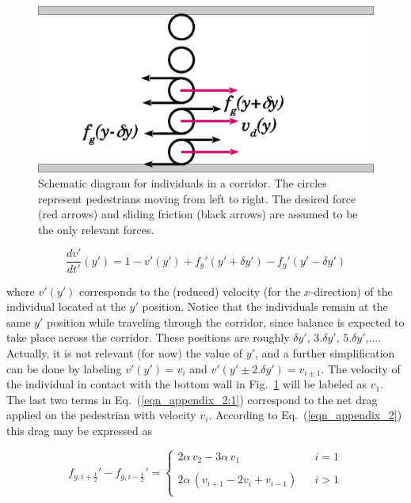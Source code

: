 \begin{figure}[htbp!]
\includegraphics[width=\columnwidth]
{./plots/pasillo.eps}
\caption{\label{pasillo} Schematic diagram for individuals in a corridor. 
The circles represent pedestrians moving from left to right. The desired force 
(red arrows) and sliding friction (black arrows) are assumed to be the only 
relevant forces.}
\end{figure}

 
\begin{equation}
\displaystyle\frac{dv'}{dt'}(y')=1-v'(y')+f_g'(y'+\delta 
y')-f_g'(y'-\delta y')\label{eqn_appendix_2:1}
 \end{equation}

where $v'(y')$ corresponds to the (reduced) velocity (for the $x$-direction) of 
the individual located at the $y'$ position. Notice that the individuals 
remain at the same $y'$ position while traveling through the corridor, since 
balance is expected to take place across the corridor. These positions are 
roughly $\delta y'$, $3.\delta y'$, $5.\delta y'$,.... Actually, it is not 
relevant (for now) the value of $y'$, and a further simplification can be done 
by labeling $v'(y')=v_i$ and $v'(y'\pm 2.\delta y')=v_{i\pm 1}$. The velocity 
of the individual in contact with the bottom wall in Fig.~\ref{pasillo} will be 
labeled as $v_1$. \\

The last two terms in Eq.~(\ref{eqn_appendix_2:1}) correspond to the 
net drag applied on the pedestrian with velocity $v_i$. According to 
Eq.~(\ref{eqn_appendix_2}) this drag may be expressed as

\begin{equation}
 f_{g,i+\frac{1}{2}}'-f_{g,i-\frac{1}{2}}'=
  \left\{\begin{array}{lcl}
          2\alpha\,v_{2}-3\alpha\,v_{1} &  & i=1 \\
          & & \\
          2\alpha\,(v_{i+1}-2v_i+v_{i-1}) & & i>1\\
         \end{array}\right.\label{eqn_appendix_2:2}
\end{equation}

